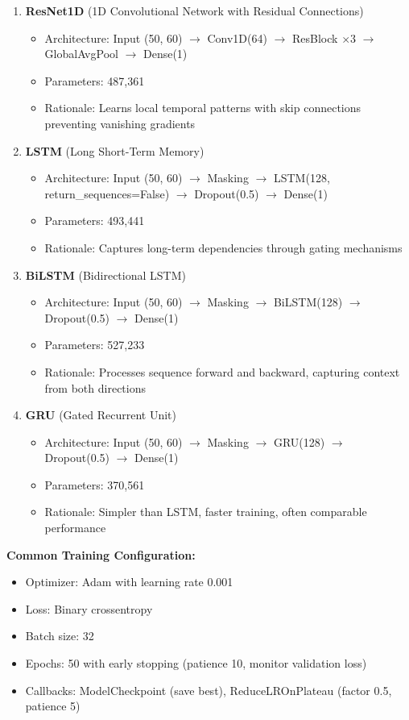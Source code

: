 \documentclass[11pt,a4paper]{article}
\begin{document}
\begin{enumerate}
\item \textbf{ResNet1D} (1D Convolutional Network with Residual Connections)
   \begin{itemize}
   \item Architecture: Input (50, 60) $\to$ Conv1D(64) $\to$ ResBlock $\times 3$ $\to$ GlobalAvgPool $\to$ Dense(1)
   \item Parameters: 487,361
   \item Rationale: Learns local temporal patterns with skip connections preventing vanishing gradients
   \end{itemize}

\item \textbf{LSTM} (Long Short-Term Memory)
   \begin{itemize}
   \item Architecture: Input (50, 60) $\to$ Masking $\to$ LSTM(128, return\_sequences=False) $\to$ Dropout(0.5) $\to$ Dense(1)
   \item Parameters: 493,441
   \item Rationale: Captures long-term dependencies through gating mechanisms
   \end{itemize}

\item \textbf{BiLSTM} (Bidirectional LSTM)
   \begin{itemize}
   \item Architecture: Input (50, 60) $\to$ Masking $\to$ BiLSTM(128) $\to$ Dropout(0.5) $\to$ Dense(1)
   \item Parameters: 527,233
   \item Rationale: Processes sequence forward and backward, capturing context from both directions
   \end{itemize}

\item \textbf{GRU} (Gated Recurrent Unit)
   \begin{itemize}
   \item Architecture: Input (50, 60) $\to$ Masking $\to$ GRU(128) $\to$ Dropout(0.5) $\to$ Dense(1)
   \item Parameters: 370,561
   \item Rationale: Simpler than LSTM, faster training, often comparable performance
   \end{itemize}
\end{enumerate}

\textbf{Common Training Configuration:}
\begin{itemize}
\item Optimizer: Adam with learning rate 0.001
\item Loss: Binary crossentropy
\item Batch size: 32
\item Epochs: 50 with early stopping (patience 10, monitor validation loss)
\item Callbacks: ModelCheckpoint (save best), ReduceLROnPlateau (factor 0.5, patience 5)
\end{itemize}
\end{document}
